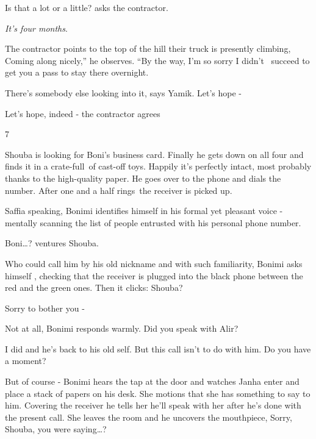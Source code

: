 \documentclass[letterpaper]{article}
\begin{document}
{\textquotedbl}Is that a lot or a little?{\textquotedbl} asks the contractor. 

{\textquotedbl}\textit{It's four months}.{\textquotedbl} 

The contractor points to the top of the hill their truck is presently climbing, {\textquotedbl}Coming along nicely,'' he
observes. ``By the way, I'm so sorry I didn't \ succeed to get you a pass to stay there overnight.{\textquotedbl} 

{\textquotedbl}There's somebody else looking into it,{\textquotedbl} says Yamik. {\textquotedbl}Let's hope
-{\textquotedbl} 

{\textquotedbl}Let's hope, indeed -{\textquotedbl} the contractor agrees


\bigskip

7 \ 

Shouba is looking for Boni's business card. Finally he gets down on all four and finds it in a crate-full~of cast-off
toys. Happily it's perfectly intact, most probably thanks to the high-quality paper. He goes over to the phone and
dials the number. After one and a half rings~the receiver is picked up.

{\textquotedbl}Saffia speaking,{\textquotedbl} Bonimi identifies himself in his formal yet pleasant voice - mentally
scanning the list of people entrusted with his personal phone number.

{\textquotedbl}Boni{\dots}?{\textquotedbl} ventures Shouba. 

Who could call him by his old nickname and with such familiarity, Bonimi asks himself , checking that the receiver is
plugged into the black phone between the red and the green ones. Then it clicks: {\textquotedbl}Shouba?{\textquotedbl} 

{\textquotedbl}Sorry to bother you -{\textquotedbl}

{\textquotedbl}Not at all,{\textquotedbl} Bonimi responds warmly. {\textquotedbl}Did you speak with Alir?{\textquotedbl}

{\textquotedbl}I did and he's back to his old self. But this call isn't to do with him. Do you have a
moment?{\textquotedbl}

{\textquotedbl}But of course -{\textquotedbl} Bonimi hears the tap at the door and watches Janha enter and place a stack
of papers on his desk. She motions that she has something to say to him. Covering the receiver he tells her he'll speak
with her after he's done with the present call. She leaves the room and he uncovers the mouthpiece,
{\textquotedbl}Sorry, Shouba, you were saying{\dots}?{\textquotedbl}
\end{document}
